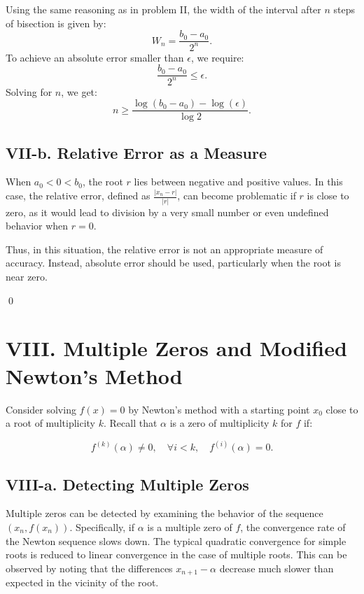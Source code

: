 \documentclass[a4paper]{article}
\begin{document}
Using the same reasoning as in problem II, the width of the interval after \( n \) steps of bisection is given by:
\[
W_n = \frac{b_0 - a_0}{2^n}.
\]
To achieve an absolute error smaller than \( \epsilon \), we require:
\[
\frac{b_0 - a_0}{2^n} \leq \epsilon.
\]
Solving for \( n \), we get:
\[
n \geq \frac{\log(b_0 - a_0) - \log(\epsilon)}{\log 2}.
\]

\subsection*{VII-b. Relative Error as a Measure}

When \( a_0 < 0 < b_0 \), the root \( r \) lies between negative and positive values. In this case, the relative error, defined as \( \frac{|x_n - r|}{|r|} \), can become problematic if \( r \) is close to zero, as it would lead to division by a very small number or even undefined behavior when \( r = 0 \).

Thus, in this situation, the relative error is not an appropriate measure of accuracy. Instead, absolute error should be used, particularly when the root is near zero.

\qed

\section*{VIII. Multiple Zeros and Modified Newton’s Method}

Consider solving \( f(x) = 0 \) by Newton’s method with a starting point \( x_0 \) close to a root of multiplicity \( k \). Recall that \( \alpha \) is a zero of multiplicity \( k \) for \( f \) if:

\[
f^{(k)}(\alpha) \neq 0, \quad \forall i < k, \quad f^{(i)}(\alpha) = 0.
\]

\subsection*{VIII-a. Detecting Multiple Zeros}

Multiple zeros can be detected by examining the behavior of the sequence \( (x_n, f(x_n)) \). Specifically, if \( \alpha \) is a multiple zero of \( f \), the convergence rate of the Newton sequence slows down. The typical quadratic convergence for simple roots is reduced to linear convergence in the case of multiple roots. This can be observed by noting that the differences \( x_{n+1} - \alpha \) decrease much slower than expected in the vicinity of the root.
\end{document}
